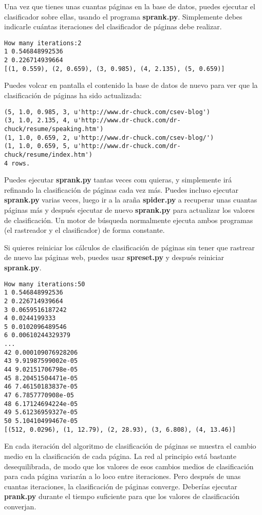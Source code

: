 Una vez que tienes unas cuantas páginas en la base de datos, puedes ejecutar el clasificador sobre ellas, usando el programa {\bf sprank.py}. Simplemente debes indicarle cuántas
iteraciones del clasificador de páginas debe realizar.

\beforeverb
\begin{verbatim}
How many iterations:2
1 0.546848992536
2 0.226714939664
[(1, 0.559), (2, 0.659), (3, 0.985), (4, 2.135), (5, 0.659)]
\end{verbatim}
\afterverb
%
Puedes volcar en pantalla el contenido la base de datos de nuevo para ver que la clasificación de
páginas ha sido actualizada:

\beforeverb
\begin{verbatim}
(5, 1.0, 0.985, 3, u'http://www.dr-chuck.com/csev-blog')
(3, 1.0, 2.135, 4, u'http://www.dr-chuck.com/dr-chuck/resume/speaking.htm')
(1, 1.0, 0.659, 2, u'http://www.dr-chuck.com/csev-blog/')
(1, 1.0, 0.659, 5, u'http://www.dr-chuck.com/dr-chuck/resume/index.htm')
4 rows.
\end{verbatim}
\afterverb
%
Puedes ejecutar {\bf sprank.py} tantas veces com quieras, y simplemente irá refinando
la clasificación de páginas cada vez más. Puedes incluso ejecutar {\bf sprank.py} varias veces,
luego ir a la araña {\bf spider.py} a recuperar unas cuantas páginas más y después ejecutar de nuevo
{\bf sprank.py} para actualizar los valores de clasificación. Un motor de búsqueda normalmente
ejecuta ambos programas (el rastreador y el clasificador) de forma constante.

Si quieres reiniciar los cálculos de clasificación de páginas sin tener que rastrear de nuevo
las páginas web, puedes usar {\bf spreset.py} y después reiniciar {\bf sprank.py}.

\beforeverb
\begin{verbatim}
How many iterations:50
1 0.546848992536
2 0.226714939664
3 0.0659516187242
4 0.0244199333
5 0.0102096489546
6 0.00610244329379
...
42 0.000109076928206
43 9.91987599002e-05
44 9.02151706798e-05
45 8.20451504471e-05
46 7.46150183837e-05
47 6.7857770908e-05
48 6.17124694224e-05
49 5.61236959327e-05
50 5.10410499467e-05
[(512, 0.0296), (1, 12.79), (2, 28.93), (3, 6.808), (4, 13.46)]
\end{verbatim}
\afterverb
%
En cada iteración del algoritmo de clasificación de páginas se muestra el cambio
medio en la clasificación de cada página. La red al principio está bastante
desequilibrada, de modo que los valores de esos cambios medios de clasificación
para cada página variarán a lo loco entre iteraciones. Pero después de unas cuantas
iteraciones, la clasificación de páginas converge. Deberías
ejecutar {\bf prank.py} durante el tiempo suficiente para que los valores de clasificación
converjan.

